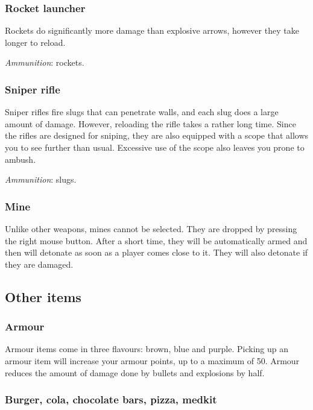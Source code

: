 \documentclass[a4paper,titlepage]{article}
\begin{document}
\subsubsection*{Rocket launcher}

Rockets do significantly more damage than explosive arrows, however
they take longer to reload.

\noindent
\emph{Ammunition}: rockets.

\subsubsection*{Sniper rifle}

Sniper rifles fire slugs that can penetrate walls, and each slug does
a large amount of damage.  However, reloading the rifle takes a rather
long time.  Since the rifles are designed for sniping, they are also
equipped with a scope that allows you to see further than usual.
Excessive use of the scope also leaves you prone to ambush.

\noindent
\emph{Ammunition}: slugs.

\subsubsection*{Mine}

Unlike other weapons, mines cannot be selected.  They are dropped by
pressing the right mouse button.  After a short time, they will be
automatically armed and then will detonate as soon as a player comes
close to it.  They will also detonate if they are damaged.


\subsection{Other items}

\subsubsection*{Armour}

Armour items come in three flavours: brown, blue and purple.  Picking
up an armour item will increase your armour points, up to a maximum of
50.  Armour reduces the amount of damage done by bullets and
explosions by half.

\subsubsection*{Burger, cola, chocolate bars, pizza, medkit}
\end{document}

